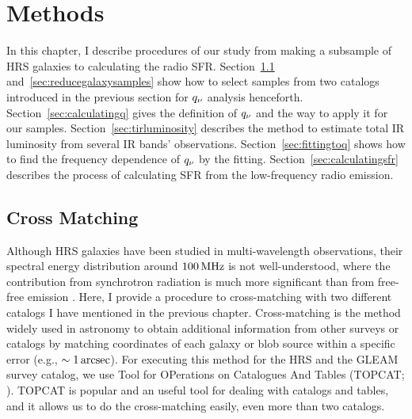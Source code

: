 \chapter{Methods}\label{chap:methods}
\begin{chapabstract}

In this chapter, I describe procedures of our study from making a subsample of HRS galaxies to calculating the radio SFR\@.
Section~\ref{sec:crossmatching} and~\ref{sec:reducegalaxysamples} show how to select samples from two catalogs introduced in the previous section for $q_{\nu}$ analysis henceforth.
Section~\ref{sec:calculatingq} gives the definition of $q_{\nu}$ and the way to apply it for our samples.
Section~\ref{sec:tirluminosity} describes the method to estimate total IR luminosity from several IR bands' observations.
Section~\ref{sec:fittingtoq} shows how to find the frequency dependence of $q_{\nu}$ by the fitting.
Section~\ref{sec:calculatingsfr} describes the process of calculating SFR from the low-frequency radio emission.

\end{chapabstract}

\section{Cross Matching}\label{sec:crossmatching}
Although HRS galaxies have been studied in multi-wavelength observations, their spectral energy distribution around $100\,\mathrm{MHz}$ is not well-understood, where the contribution from synchrotron radiation is much more significant than from free-free emission \citep{Condon1992a}.
Here, I provide a procedure to cross-matching with two different catalogs I have mentioned in the previous chapter.
Cross-matching is the method widely used in astronomy to obtain additional information from other surveys or catalogs by matching coordinates of each galaxy or blob source within a specific error (e.g., $\sim 1\,\mathrm{arcsec}$).
For executing this method for the HRS and the GLEAM survey catalog, we use Tool for OPerations on Catalogues And Tables (TOPCAT\@; \citealt{Taylor2009}).
TOPCAT is popular and an useful tool for dealing with catalogs and tables, and it allows us to do the cross-matching easily, even more than two catalogs.

